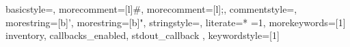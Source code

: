 
{
  basicstyle=\ttfamily\footnotesize,
  morecomment=[l]{\#},
  morecomment=[l]{;},
  commentstyle=\color{CommentColor},
  morestring=[b]',
  morestring=[b]",
  stringstyle=\color{StringColor},
  literate=*%
    {=}{{{\color{OperatorColor}{=}}}}{1},%
  morekeywords=[1]{
    inventory,
    callbacks_enabled,
    stdout_callback
  },
  keywordstyle=[1]\color{KeywordColor}
}
